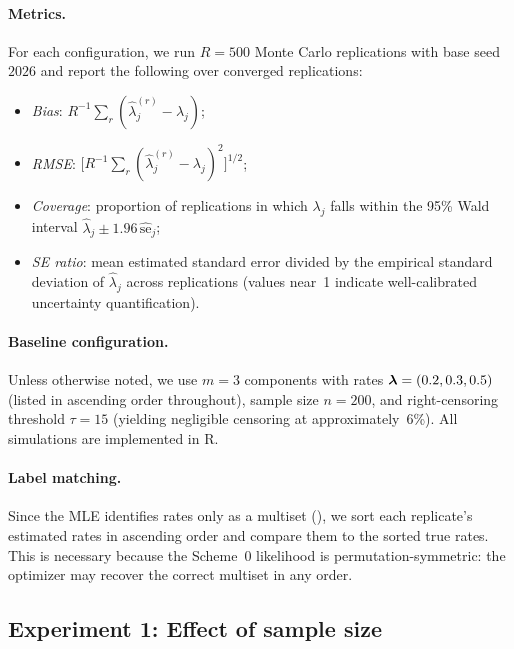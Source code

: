 \paragraph{Metrics.}
For each configuration, we run $R = 500$ Monte Carlo replications with
base seed $2026$ and report the following over converged replications:
\begin{itemize}
  \item \emph{Bias}: $R^{-1}\sum_{r} (\hat{\lambda}_j^{(r)} - \lambda_j)$;
  \item \emph{RMSE}: $\bigl[R^{-1}\sum_{r}(\hat{\lambda}_j^{(r)} - \lambda_j)^2\bigr]^{1/2}$;
  \item \emph{Coverage}: proportion of replications in which $\lambda_j$
    falls within the 95\% Wald interval
    $\hat{\lambda}_j \pm 1.96\,\widehat{\mathrm{se}}_j$;
  \item \emph{SE ratio}: mean estimated standard error divided by the
    empirical standard deviation of $\hat{\lambda}_j$ across replications
    (values near~1 indicate well-calibrated uncertainty quantification).
\end{itemize}

\paragraph{Baseline configuration.}
Unless otherwise noted, we use $m = 3$ components with rates
$\boldsymbol{\lambda} = (0.2, 0.3, 0.5)$ (listed in ascending order throughout),
sample size $n = 200$, and right-censoring
threshold $\tau = 15$ (yielding negligible censoring at approximately~6\%).
All simulations are implemented in R.

\paragraph{Label matching.}
Since the MLE identifies rates only as a multiset
(), we sort each replicate's estimated rates
in ascending order and compare them to the sorted true rates.
This is necessary because the Scheme~0 likelihood is
permutation-symmetric: the optimizer may recover the correct
multiset in any order.


\subsection{Experiment 1: Effect of sample size}
\label{sec:sim-sample-size}

